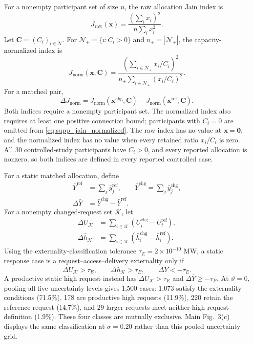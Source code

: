 \documentclass[11pt]{article}
\begin{document}
For a nonempty participant set of size $n$, the raw allocation Jain index is
\begin{equation}
J_{\mathrm{raw}}(\mathbf x)
=\frac{(\sum_i x_i)^2}{n\sum_i x_i^2}.
\label{eq:supp_jain_raw}
\end{equation}
Let $\mathbf C=(C_i)_{i\in\mathcal N}$. For
$\mathcal N_+=\{i:C_i>0\}$ and $n_+=|\mathcal N_+|$, the
capacity-normalized index is
\begin{equation}
J_{\mathrm{norm}}(\mathbf x,\mathbf C)
=\frac{(\sum_{i\in\mathcal N_+}x_i/C_i)^2}
{n_+\sum_{i\in\mathcal N_+}(x_i/C_i)^2}.
\label{eq:supp_jain_normalized}
\end{equation}
For a matched pair,
\begin{equation}
\Delta J_{\mathrm{norm}}
=J_{\mathrm{norm}}(\mathbf x^{\mathrm{chg}},\mathbf C)
-J_{\mathrm{norm}}(\mathbf x^{\mathrm{ref}},\mathbf C).
\label{eq:supp_jain_change}
\end{equation}
Both indices require a nonempty participant set. The normalized index also
requires at least one positive connection bound; participants with $C_i=0$ are
omitted from \eqref{eq:supp_jain_normalized}. The raw index has no value at
$\mathbf x=\mathbf0$, and the normalized index has no value when every retained
ratio $x_i/C_i$ is zero. All 30 controlled-study participants have $C_i>0$, and
every reported allocation is nonzero, so both indices are defined in every
reported controlled case.

For a static matched allocation, define
\begin{align}
\bar Y^{\mathrm{ref}}&=\sum_j\bar y_j^{\mathrm{ref}},\qquad
\bar Y^{\mathrm{chg}}=\sum_j\bar y_j^{\mathrm{chg}},\nonumber\\
\Delta\bar Y&=\bar Y^{\mathrm{chg}}-\bar Y^{\mathrm{ref}}.
\label{eq:supp_expected_delivery_totals}
\end{align}
For a nonempty changed-request set $\mathcal K$, let
\begin{align}
\Delta U_{\mathcal K}
&=\sum_{i\in\mathcal K}
\left(U_i^{\mathrm{chg}}-U_i^{\mathrm{ref}}\right),\nonumber\\
\Delta\bar h_{\mathcal K}
&=\sum_{i\in\mathcal K}
\left(\bar h_i^{\mathrm{chg}}-\bar h_i^{\mathrm{ref}}\right).
\label{eq:supp_expected_group_classification_changes}
\end{align}
Using the externality-classification tolerance
$\tau_E=2\times10^{-10}$ MW, a static response case is a
request--access--delivery externality only if
\begin{equation}
\Delta U_{\mathcal K}>\tau_E,
\qquad
\Delta\bar h_{\mathcal K}>\tau_E,
\qquad
\Delta\bar Y<-\tau_E.
\label{eq:supp_expected_externality_condition}
\end{equation}
A productive static high request instead has
$\Delta U_{\mathcal K}>\tau_E$ and $\Delta\bar Y\ge-\tau_E$.
At $\vartheta=0$, pooling all five uncertainty levels gives 1,500 cases:
1,073 satisfy the externality conditions (71.5\%), 178 are productive high
requests (11.9\%), 220 retain the reference request (14.7\%), and 29 larger
requests meet neither high-request definition (1.9\%). These four classes are
mutually exclusive. Main Fig.~3(c) displays the same classification at
$\sigma=0.20$ rather than this pooled uncertainty grid.
\end{document}
